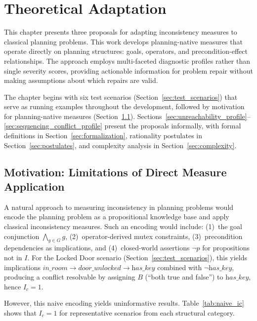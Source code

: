 \section{Theoretical Adaptation}
\label{sec:theoretical_adaptation}

This chapter presents three proposals for adapting inconsistency measures to classical planning problems. This work develops planning-native measures that operate directly on planning structures: goals, operators, and precondition-effect relationships. The approach employs multi-faceted diagnostic profiles rather than single severity scores, providing actionable information for problem repair without making assumptions about which repairs are valid.

The chapter begins with six test scenarios (Section~\ref{sec:test_scenarios}) that serve as running examples throughout the development, followed by motivation for planning-native measures (Section~\ref{sec:naive_encoding}). Sections~\ref{sec:unreachability_profile}--\ref{sec:sequencing_conflict_profile} present the proposals informally, with formal definitions in Section~\ref{sec:formalization}, rationality postulates in Section~\ref{sec:postulates}, and complexity analysis in Section~\ref{sec:complexity}.



\subsection{Motivation: Limitations of Direct Measure Application}
\label{sec:naive_encoding}

A natural approach to measuring inconsistency in planning problems would encode the planning problem as a propositional knowledge base and apply classical inconsistency measures. Such an encoding would include: (1)~the goal conjunction $\bigwedge_{g \in G} g$, (2)~operator-derived mutex constraints, (3)~precondition dependencies as implications, and (4)~closed-world assertions $\neg p$ for propositions not in $I$. For the Locked Door scenario (Section~\ref{sec:test_scenarios}), this yields implications $\textit{in\_room} \rightarrow \textit{door\_unlocked} \rightarrow \textit{has\_key}$ combined with $\neg\textit{has\_key}$, producing a conflict resolvable by assigning $B$ (``both true and false'') to $\textit{has\_key}$, hence $I_c = 1$.

However, this naive encoding yields uninformative results. Table~\ref{tab:naive_ic} shows that $I_c = 1$ for representative scenarios from each structural category.

